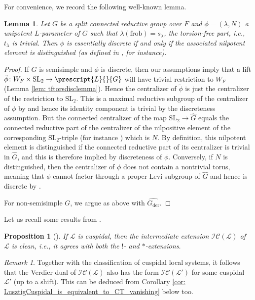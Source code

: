 \documentclass{amsart}
\newtheorem{lemma}[theorem]{Lemma}
\newtheorem{proposition}[theorem]{Proposition}
\theoremstyle{definition}
\theoremstyle{remark}
\newtheorem{remark}[theorem]{Remark}
\numberwithin{equation}{section}
\newcommand{\der}{\mathrm{der}}
\newcommand{\mc}{\mathcal}
\newcommand{\SL}{\mathrm{SL}}
\newcommand{\co}[1]{\prescript{#1}{}}
\newcommand{\wh}{\widehat}
\newcommand{\frob}{\mathrm{frob}}
\begin{document}
For convenience, we record the following well-known lemma.
\begin{lemma}{\label{lem: discequalsdistforunip}}
Let $G$ be a split connected reductive group over $F$ and $\phi=(\lambda, N)$ a unipotent $L$-parameter of $G$ such that $\lambda(\frob) = s_{\lambda}$, the torsion-free part, i.e., $t_\lambda$ is trivial. Then $\phi$ is essentially discrete if and only if the associated nilpotent element is distinguished (as defined in \cite[\S8.2]{CollingWoodMcGovern}, for instance).
\end{lemma}
\begin{proof}
If $G$ is semisimple and $\phi$ is discrete, then our assumptions imply that a lift $\tilde{\phi}\colon W_F \times \SL_2 \rightarrow \co{L}{G}$ will have trivial restriction to $W_F$ (Lemma \ref{lem: tftorsdisclemma}). Hence the centralizer of $\tilde{\phi}$ is just the centralizer of the restriction to $\SL_2$. This is a maximal reductive subgroup of the centralizer of $\phi$ by \cite[Proposition 3.7]{BMImaiYoucis} and hence its identity component is trivial by the discreteness assumption. But the connected centralizer of the map $\SL_2 \rightarrow \wh{G}$ equals the connected reductive part of the centralizer of the nilpositive element of the corresponding $\SL_2$-triple (for instance \cite[Lemma 3.7.3]{CollingWoodMcGovern}) which is $N$. By definition, this nilpotent element is distinguished if the connected reductive part of its centralizer is trivial in $\wh{G}$, and this is therefore implied by discreteness of $\phi$. Conversely, if $N$ is distinguished, then the centralizer of $\phi$ does not contain a nontrivial torus, meaning that $\phi$ cannot factor through a proper Levi subgroup of $\wh{G}$ and hence is discrete by \cite[Corollary 3.16]{BMImaiYoucis}.

For non-semisimple $G$, we argue as above with $\wh{G_{\der}}$.
\end{proof}

Let us recall some results from \cite{LusztigVanishing, LusztigGraded}.

\begin{proposition}[{\cite[\S 4.4(b)]{LusztigGraded}}]{\label{prop: constrcleanness}}
If $\mc L$ is cuspidal, then the intermediate extension $\mc{IC} (\mc L)$ of $\mc L$ is clean, i.e., it agrees with both the $!$- and $*$-extensions. 
\end{proposition}

\begin{remark}
Together with the classification of cuspidal local systems, it follows that the Verdier dual of $\mc{IC} (\mc L)$ also has the form $\mc{IC} (\mc L')$ for some cuspidal $\mc L'$ (up to a shift). This can be deduced from Corollary \ref{cor: LusztigCuspidal_is_equivalent_to_CT_vanishing} below too.   
\end{remark}
\end{document}
